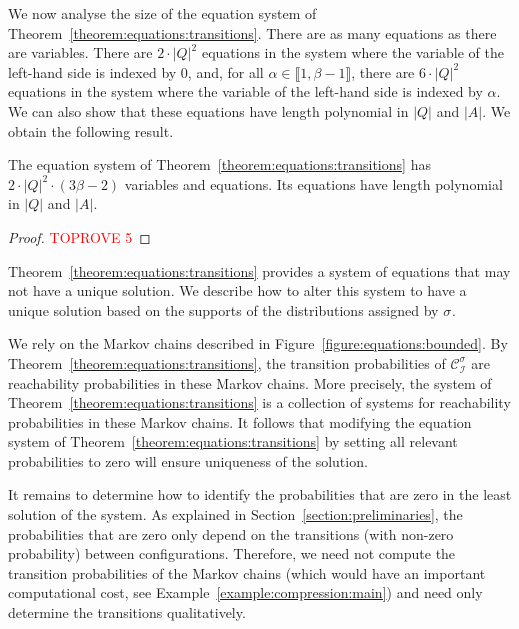\documentclass[a4paper,UKenglish,cleveref,autoref,thm-restate,colorlinks]{lipics-v2021}
\newcommand{\integerInterval}[1]{\llbracket{}#1\rrbracket{}}
\newcommand{\ocStateSpace}{Q}
\newcommand{\ocActionSpace}{A}
\newcommand{\mchain}{\mathcal{C}}
\newcommand{\intPart}{\mathcal{I}}
\newcommand{\powerIndex}{\alpha}
\newcommand{\powerMax}{\beta}
\newcommand{\compressChainStrat}[1]{\mchain^{#1}_{\intPart}}
\newcommand{\compressChain}{\compressChainStrat{\strat}}
\newcommand{\stratGeneric}[1]{{\sigma_{#1}}}
\newcommand{\strat}{\stratGeneric{}}
\begin{document}
We now analyse the size of the equation system of Theorem~\ref{theorem:equations:transitions}.
There are as many equations as there are variables.
There are $2\cdot|\ocStateSpace|^2$ equations in the system where the variable of the left-hand side is indexed by $0$, and, for all $\powerIndex\in\integerInterval{1, \powerMax-1}$, there are $6\cdot|\ocStateSpace|^2$ equations in the system where the variable of the left-hand side is indexed by $\powerIndex$.
We can also show that these equations have length polynomial in $|\ocStateSpace|$ and $|\ocActionSpace|$.
We obtain the following result.
\begin{lemma}\label{lemma:equations:bounded:size}
  The equation system of Theorem~\ref{theorem:equations:transitions} has $2\cdot|\ocStateSpace|^2\cdot(3\powerMax-2)$ variables and equations.
  Its equations have length polynomial in $|\ocStateSpace|$ and $|\ocActionSpace|$.
\end{lemma}
\begin{proof}\textcolor{red}{TOPROVE 5}\end{proof}


Theorem~\ref{theorem:equations:transitions} provides a system of equations that may not have a unique solution.
We describe how to alter this system to have a unique solution based on the supports of the distributions assigned by $\strat$.

We rely on the Markov chains described in Figure~\ref{figure:equations:bounded}.
By Theorem~\ref{theorem:equations:transitions}, the transition probabilities of $\compressChain$ are reachability probabilities in these Markov chains.
More precisely, the system of Theorem~\ref{theorem:equations:transitions} is a collection of systems for reachability probabilities in these Markov chains.
It follows that modifying the equation system of Theorem~\ref{theorem:equations:transitions} by setting all relevant probabilities to zero will ensure uniqueness of the solution.

It remains to determine how to identify the probabilities that are zero in the least solution of the system.
As explained in Section~\ref{section:preliminaries}, the probabilities that are zero only depend on the transitions (with non-zero probability) between configurations.
Therefore, we need not compute the transition probabilities of the Markov chains (which would have an important computational cost, see Example~\ref{example:compression:main}) and need only determine the transitions qualitatively.
\end{document}
